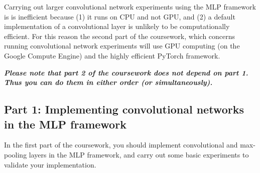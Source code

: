 \documentclass[11pt,]{article}
\begin{document}
Carrying out larger convolutional network experiments using the MLP framework is is inefficient because (1) it runs on CPU and not GPU, and (2) a  default implementation of a convolutional layer is unlikely to be computationally efficient.  For this reason the second part of the coursework, which concerns running convolutional network experiments will use GPU computing (on the Google Compute Engine) and the highly efficient PyTorch framework.

\textbf{\emph{Please note that part 2 of the coursework does not depend on part 1. \\
Thus you can do them in either order (or simultaneously).}}

\subsection*{Part 1:  Implementing convolutional networks in the MLP framework}
\label{sec:mlp}
In the first part of the coursework, you should implement convolutional  and max-pooling layers in the MLP framework, and carry out some basic experiments to validate your implementation.
\end{document}
